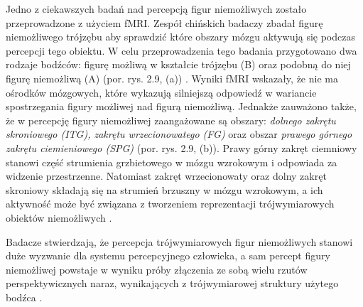 \documentclass[licencjacka]{kdypl}
\begin{document}
Jedno z ciekawszych badań nad percepcją figur niemożliwych zostało przeprowadzone z użyciem fMRI. Zespół chińskich badaczy zbadał figurę niemożliwego trójzębu aby sprawdzić które obszary mózgu aktywują się podczas percepcji tego obiektu. W celu przeprowadzenia tego badania przygotowano dwa rodzaje bodźców: figurę możliwą w kształcie trójzębu (B) oraz podobną do niej figurę niemożliwą (A) (por. rys. 2.9, (a)) \citep[s. 19]{Wu2012}. Wyniki fMRI wskazały, że nie ma ośrodków mózgowych, które wykazują silniejszą odpowiedź w wariancie spostrzegania figury możliwej nad figurą niemożliwą. Jednakże zauważono także, że w percepcję figury niemożliwej zaangażowane są obszary: \textit{dolnego zakrętu skroniowego (ITG), zakrętu wrzecionowatego (FG)} oraz obszar \textit{prawego górnego zakrętu ciemieniowego (SPG)} (por. rys. 2.9, (b)). Prawy górny zakręt ciemniowy stanowi część strumienia grzbietowego w mózgu wzrokowym i odpowiada za widzenie przestrzenne. Natomiast zakręt wrzecionowaty oraz dolny zakręt skroniowy składają się na strumień brzuszny w mózgu wzrokowym, a ich aktywność może być związana z tworzeniem reprezentacji trójwymiarowych obiektów niemożliwych \citep[s. 20]{Wu2012}.

Badacze stwierdzają, że percepcja trójwymiarowych figur niemożliwych stanowi duże wyzwanie dla systemu percepcyjnego człowieka, a sam percept figury niemożliwej powstaje w wyniku próby złączenia ze sobą wielu rzutów perspektywicznych naraz, wynikających z trójwymiarowej struktury użytego bodźca \citep[s. 19-20]{Wu2012}.
\end{document}
